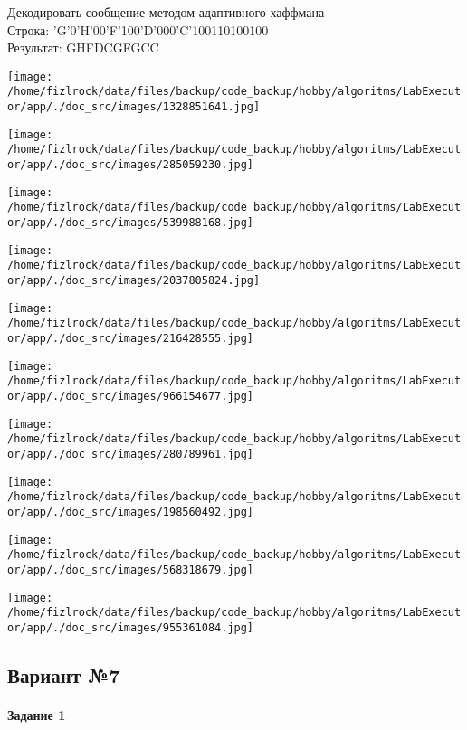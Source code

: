 \documentclass[a4paper, 12pt]{article}
\begin{document}
Декодировать сообщение методом адаптивного хаффмана \\
Строка: 
'G'0'H'00'F'100'D'000'C'100110100100\\
Результат: GHFDCGFGCC

\texttt{[image: /home/fizlrock/data/files/backup/code\_backup/hobby/algoritms/LabExecutor/app/./doc\_src/images/1328851641.jpg]}

\texttt{[image: /home/fizlrock/data/files/backup/code\_backup/hobby/algoritms/LabExecutor/app/./doc\_src/images/285059230.jpg]}

\texttt{[image: /home/fizlrock/data/files/backup/code\_backup/hobby/algoritms/LabExecutor/app/./doc\_src/images/539988168.jpg]}

\texttt{[image: /home/fizlrock/data/files/backup/code\_backup/hobby/algoritms/LabExecutor/app/./doc\_src/images/2037805824.jpg]}

\texttt{[image: /home/fizlrock/data/files/backup/code\_backup/hobby/algoritms/LabExecutor/app/./doc\_src/images/216428555.jpg]}

\texttt{[image: /home/fizlrock/data/files/backup/code\_backup/hobby/algoritms/LabExecutor/app/./doc\_src/images/966154677.jpg]}

\texttt{[image: /home/fizlrock/data/files/backup/code\_backup/hobby/algoritms/LabExecutor/app/./doc\_src/images/280789961.jpg]}

\texttt{[image: /home/fizlrock/data/files/backup/code\_backup/hobby/algoritms/LabExecutor/app/./doc\_src/images/198560492.jpg]}

\texttt{[image: /home/fizlrock/data/files/backup/code\_backup/hobby/algoritms/LabExecutor/app/./doc\_src/images/568318679.jpg]}

\texttt{[image: /home/fizlrock/data/files/backup/code\_backup/hobby/algoritms/LabExecutor/app/./doc\_src/images/955361084.jpg]}
\pagebreak
\subsection{Вариант №7}
\paragraph{Задание 1}
\end{document}

